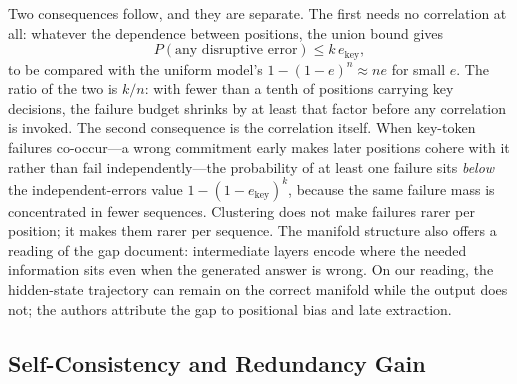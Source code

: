 Two consequences follow, and they are separate. The first needs no correlation at all: whatever the dependence between positions, the union bound gives
\begin{equation}
\label{eq:union}
P(\text{any disruptive error}) \le k\, e_{\text{key}},
\end{equation}
to be compared with the uniform model's $1-(1-e)^n \approx n e$ for small $e$. The ratio of the two is $k/n$: with fewer than a tenth of positions carrying key decisions, the failure budget shrinks by at least that factor before any correlation is invoked. The second consequence is the correlation itself. When key-token failures co-occur---a wrong commitment early makes later positions cohere with it rather than fail independently---the probability of at least one failure sits \emph{below} the independent-errors value $1-(1-e_{\text{key}})^k$, because the same failure mass is concentrated in fewer sequences. Clustering does not make failures rarer per position; it makes them rarer per sequence. The manifold structure also offers a reading of the gap \citet{gao2024insights} document: intermediate layers encode where the needed information sits even when the generated answer is wrong. On our reading, the hidden-state trajectory can remain on the correct manifold while the output does not; the authors attribute the gap to positional bias and late extraction.

\subsection{Self-Consistency and Redundancy Gain}

